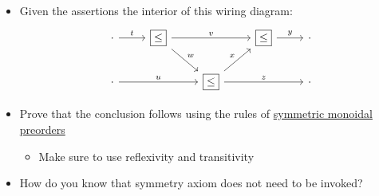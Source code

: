 \begin{itemize}
    \item Given the assertions the interior of this wiring diagram:  \[\begin{tikzcd}[ampersand replacement=\&]
              \cdot \arrow[r, "t"]  \& \boxed{\leq} \arrow[rr, "v"] \arrow[rd, "w"]\& \& \boxed{\leq} \arrow[r, "y"] \& \cdot \\
              \cdot \arrow[rr, "u"] \& \& \boxed{\leq} \arrow[ru, "x"] \arrow[rr,"z"] \&                             \& \cdot
            \end{tikzcd}\]

    \item Prove that the conclusion follows using the rules of \hyperref[D2.2]{symmetric monoidal preorders}
          \begin{itemize}
            \item Make sure to use reflexivity and transitivity
          \end{itemize}
    \item How do you know that symmetry axiom does not need to be invoked?
  \end{itemize}

